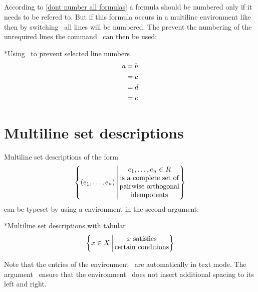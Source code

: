 \subsection{\texorpdfstring{}{{\tbs}notag}}

According to \cref{dont number all formulas} a formula should be numbered only if it needs to be refered to.
But if this formula occurs in a multiline environment like~ then by switching~ all lines will be numbered.
The prevent the numbering of the unrequired lines the command~ can then be used:
\begin{showlatex}*{Using~ to prevent selected line numbers}
\begin{align}
  a
  &= b \notag \\
  &= c \\
  &= d \notag \\
  &= e
\end{align}
\end{showlatex}





\section{Multiline set descriptions}

Multiline set descriptions of the form
\[
  \left\{
    (e_1, \dotsc, e_n)
  \,\middle|\,
    \begin{tabular}{@{}c@{}}
      $e_1, \dotsc, e_n \in R$ \\
      is a complete set of \\
      pairwise orthogonal \\
      idempotents
    \end{tabular}
  \right\}
\]
can be typeset by using a  environment in the second argument:
\begin{showlatex}*{Multiline set descriptions with tabular}
\[
  \left\{
    x \in X
  \,\middle|\,
    \begin{tabular}{@{}c@{}}
      $x$ satisfies \\
      certain conditions
    \end{tabular}
  \right\}
\]
\end{showlatex}
Note that the entries of the environment~ are automatically in text mode.
The argument~\inlinecode{\@\{\}} ensure that the environment~ does not insert additional spacing to its left and right.






